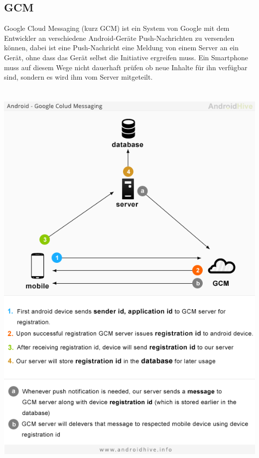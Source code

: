 \documentclass[10pt, a4paper,headsepline]{scrreprt}
\begin{document}
\subsection{GCM}
Google Cloud Messaging (kurz GCM) ist ein System von Google mit dem Entwickler an verschiedene Android-Geräte Push-Nachrichten zu versenden können, dabei ist eine Push-Nachricht eine Meldung von einem Server an ein Gerät, ohne dass das Gerät selbst die Initiative ergreifen muss. Ein Smartphone muss auf diesem Wege nicht dauerhaft prüfen ob neue Inhalte für ihn verfügbar sind, sondern es wird ihm vom Server mitgeteilt. \\ \\ \\
\includegraphics[scale=0.6]{gcm-a-modr.png}
\end{document}

